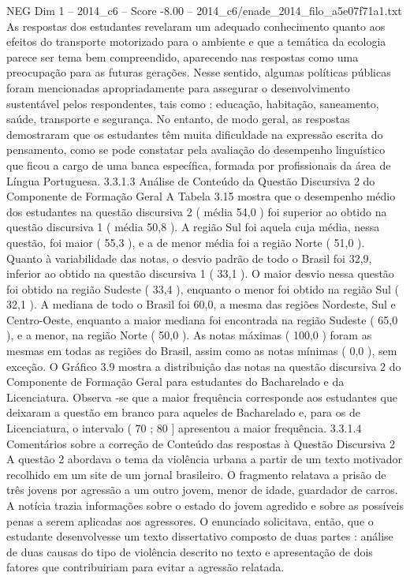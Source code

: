 \begin{textsample}{NEG Dim 1 – 2014\_c6 – Score -8.00 – 2014\_c6/enade\_2014\_filo\_a5e07f71a1.txt}
As respostas dos estudantes revelaram um adequado conhecimento quanto aos efeitos do transporte motorizado para o ambiente e que a temática da ecologia parece ser tema bem compreendido, aparecendo nas respostas como uma preocupação para as futuras gerações.
Nesse sentido, algumas políticas públicas foram mencionadas apropriadamente para assegurar o desenvolvimento sustentável pelos respondentes, tais como : educação, habitação, saneamento, saúde, transporte e segurança.
No entanto, de modo geral, as respostas demostraram que os estudantes têm muita dificuldade na expressão escrita do pensamento, como se pode constatar pela avaliação do desempenho linguístico que ficou a cargo de uma banca específica, formada por profissionais da área de Língua Portuguesa. 3.3.1.3 Análise de Conteúdo da Questão Discursiva 2 do Componente de Formação Geral A Tabela 3.15 mostra que o desempenho médio dos estudantes na questão discursiva 2 ( média 54,0 ) foi superior ao obtido na questão discursiva 1 ( média 50,8 ).
A região Sul foi aquela cuja média, nessa questão, foi maior ( 55,3 ), e a de menor média foi a região Norte ( 51,0 ).
Quanto à variabilidade das notas, o desvio padrão de todo o Brasil foi 32,9, inferior ao obtido na questão discursiva 1 ( 33,1 ).
O maior desvio nessa questão foi obtido na região Sudeste ( 33,4 ), enquanto o menor foi obtido na região Sul ( 32,1 ).
A mediana de todo o Brasil foi 60,0, a mesma das regiões Nordeste, Sul e Centro-Oeste, enquanto a maior mediana foi encontrada na região Sudeste ( 65,0 ), e a menor, na região Norte ( 50,0 ).
As notas máximas ( 100,0 ) foram as mesmas em todas as regiões do Brasil, assim como as notas mínimas ( 0,0 ), sem exceção.
O Gráfico 3.9 mostra a distribuição das notas na questão discursiva 2 do Componente de Formação Geral para estudantes do Bacharelado e da Licenciatura.
Observa -se que a maior frequência corresponde aos estudantes que deixaram a questão em branco para aqueles de Bacharelado e, para os de Licenciatura, o intervalo ( 70 ; 80 ] apresentou a maior frequência. 3.3.1.4 Comentários sobre a correção de Conteúdo das respostas à Questão Discursiva 2 A questão 2 abordava o tema da violência urbana a partir de um texto motivador recolhido em um site de um jornal brasileiro.
O fragmento relatava a prisão de três jovens por agressão a um outro jovem, menor de idade, guardador de carros.
A notícia trazia informações sobre o estado do jovem agredido e sobre as possíveis penas a serem aplicadas aos agressores.
O enunciado solicitava, então, que o estudante desenvolvesse um texto dissertativo composto de duas partes : análise de duas causas do tipo de violência descrito no texto e apresentação de dois fatores que contribuiriam para evitar a agressão relatada.

\end{textsample}

